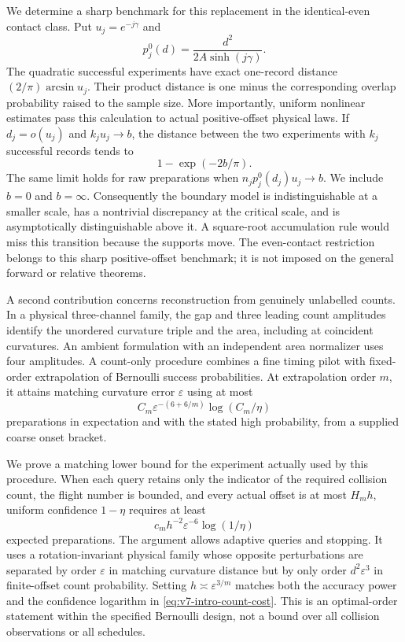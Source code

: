 We determine a sharp benchmark for this replacement in the identical-even contact class. Put $u_j=e^{-j\gamma}$ and
\[
 p_j^0(d)=\frac{d^2}{2A\sinh(j\gamma)}.
\]
The quadratic successful experiments have exact one-record distance $(2/\pi)\arcsin u_j$. Their product distance is one minus the corresponding overlap probability raised to the sample size. More importantly, uniform nonlinear estimates pass this calculation to actual positive-offset physical laws. If $d_j=o(u_j)$ and $k_ju_j\to b$, the distance between the two experiments with $k_j$ successful records tends to
\begin{equation}\label{eq:v7-intro-phase}
                  1-\exp(-2b/\pi).
\end{equation}
The same limit holds for raw preparations when $n_jp_j^0(d_j)u_j\to b$. We include $b=0$ and $b=\infty$. Consequently the boundary model is indistinguishable at a smaller scale, has a nontrivial discrepancy at the critical scale, and is asymptotically distinguishable above it. A square-root accumulation rule would miss this transition because the supports move. The even-contact restriction belongs to this sharp positive-offset benchmark; it is not imposed on the general forward or relative theorems.

A second contribution concerns reconstruction from genuinely unlabelled counts. In a physical three-channel family, the gap and three leading count amplitudes identify the unordered curvature triple and the area, including at coincident curvatures. An ambient formulation with an independent area normalizer uses four amplitudes. A count-only procedure combines a fine timing pilot with fixed-order extrapolation of Bernoulli success probabilities. At extrapolation order $m$, it attains matching curvature error $\varepsilon$ using at most
\begin{equation}\label{eq:v7-intro-count-cost}
 C_m\varepsilon^{-(6+6/m)}\log(C_m/\eta)
\end{equation}
preparations in expectation and with the stated high probability, from a supplied coarse onset bracket.

We prove a matching lower bound for the experiment actually used by this procedure. When each query retains only the indicator of the required collision count, the flight number is bounded, and every actual offset is at most $H_mh$, uniform confidence $1-\eta$ requires at least
\[
       c_m h^{-2}\varepsilon^{-6}\log(1/\eta)
\]
expected preparations. The argument allows adaptive queries and stopping. It uses a rotation-invariant physical family whose opposite perturbations are separated by order $\varepsilon$ in matching curvature distance but by only order $d^2\varepsilon^3$ in finite-offset count probability. Setting $h\asymp\varepsilon^{3/m}$ matches both the accuracy power and the confidence logarithm in \eqref{eq:v7-intro-count-cost}. This is an optimal-order statement within the specified Bernoulli design, not a bound over all collision observations or all schedules.

